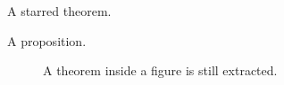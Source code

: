 \documentclass{article}
\begin{document}
\begin{theorem*}\label{thm:starred}
A starred theorem.
\end{theorem*}

\begin{proposition}\label{prop:one}
A proposition.
\end{proposition}

\begin{figure}
\begin{theorem}\label{thm:infigure}
A theorem inside a figure is still extracted.
\end{theorem}
\end{figure}
\end{document}
